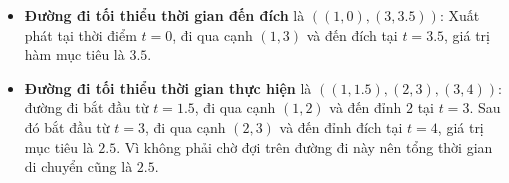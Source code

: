 \documentclass[../main.tex]{subfiles}
\begin{document}
\begin{itemize}
\tightlist
\item
  \textbf{Đường đi tối thiểu thời gian đến đích} là
  \(((1, 0), (3, 3.5))\): Xuất phát tại thời điểm \(t = 0\), đi qua cạnh
  \((1, 3)\) và đến đích tại \(t = 3.5\), giá trị hàm mục tiêu là
  \(3.5\).
\item
  \textbf{Đường đi tối thiểu thời gian thực hiện} là
  \(((1, 1.5), (2, 3), (3, 4))\): đường đi bắt đầu từ \(t = 1.5\), đi
  qua cạnh \((1, 2)\) và đến đỉnh \(2\) tại \(t = 3\). Sau đó bắt đầu từ
  \(t = 3\), đi qua cạnh \((2, 3)\) và đến đỉnh đích tại \(t = 4\), giá
  trị mục tiêu là \(2.5\). Vì không phải chờ đợi trên đường đi này nên
  tổng thời gian di chuyển cũng là \(2.5\).
\end{itemize}
\end{document}
